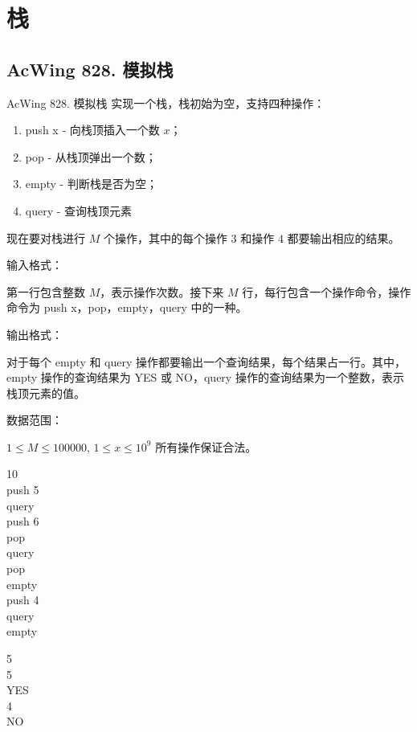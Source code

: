 \section{栈}

\subsection{AcWing 828. 模拟栈}
\begin{titledbox}{AcWing 828. 模拟栈}
    实现一个栈，栈初始为空，支持四种操作：

    \begin{enumerate}
        \itemsep=-5pt
        \item push x - 向栈顶插入一个数 $x$；
        \item pop - 从栈顶弹出一个数；
        \item empty - 判断栈是否为空；
        \item query - 查询栈顶元素
    \end{enumerate}

    现在要对栈进行 $M$ 个操作，其中的每个操作 $3$ 和操作 $4$ 都要输出相应的结果。

    输入格式：

    第一行包含整数 $M$，表示操作次数。接下来 $M$ 行，每行包含一个操作命令，操作命令为 push x，pop，empty，query 中的一种。

    输出格式：

    对于每个 empty 和 query 操作都要输出一个查询结果，每个结果占一行。其中，empty 操作的查询结果为 YES 或 NO，query 操作的查询结果为一个整数，表示栈顶元素的值。

    数据范围：

    $1 \le M \le 100000$, $1 \le x \le 10^9$ 所有操作保证合法。

    \begin{inputblock}
        10 \\
        push 5  \\
        query  \\
        push 6  \\
        pop  \\
        query  \\
        pop  \\
        empty  \\
        push 4  \\
        query  \\
        empty
    \end{inputblock}
    \begin{outputblock}
        5 \\
        5 \\
        YES \\
        4 \\
        NO
    \end{outputblock}
\end{titledbox}

